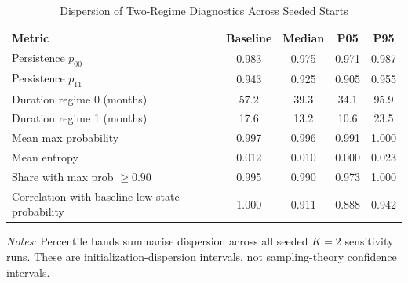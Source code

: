 \begin{table}[htbp]
\centering
\scriptsize
\caption{Dispersion of Two-Regime Diagnostics Across Seeded Starts}
\label{tab:regime_diagnostic_dispersion}
\begin{tabular}{lcccc}
\toprule
Metric & Baseline & Median & P05 & P95 \\
\midrule
Persistence $p_{00}$ & 0.983 & 0.975 & 0.971 & 0.987 \\
Persistence $p_{11}$ & 0.943 & 0.925 & 0.905 & 0.955 \\
Duration regime 0 (months) & 57.2 & 39.3 & 34.1 & 95.9 \\
Duration regime 1 (months) & 17.6 & 13.2 & 10.6 & 23.5 \\
Mean max probability & 0.997 & 0.996 & 0.991 & 1.000 \\
Mean entropy & 0.012 & 0.010 & 0.000 & 0.023 \\
Share with max prob $\geq 0.90$ & 0.995 & 0.990 & 0.973 & 1.000 \\
Correlation with baseline low-state probability & 1.000 & 0.911 & 0.888 & 0.942 \\
\bottomrule
\end{tabular}
\begin{tablenotes}
\footnotesize
\item \textit{Notes:} Percentile bands summarise dispersion across all seeded $K=2$ sensitivity runs. These are initialization-dispersion intervals, not sampling-theory confidence intervals.
\end{tablenotes}
\end{table}